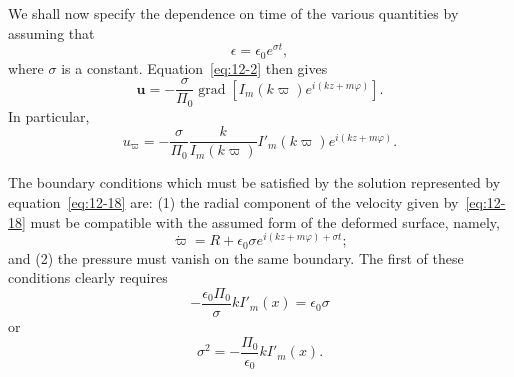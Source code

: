 We shall now specify the dependence on time of the various quantities by assuming that
\begin{equation}
\label{eq:12-16}
\epsilon = \epsilon_0 e^{\sigma t},
\end{equation}
where $\sigma$ is a constant. Equation~\eqref{eq:12-2} then gives
\begin{equation}
\label{eq:12-17}
\mathbf{u} = -\frac{\sigma}{\Pi_0}\operatorname{grad}[I_m(k\varpi)e^{i(kz+m\varphi)}].
\end{equation}
In particular,
\begin{equation}
\label{eq:12-18}
u_\varpi = -\frac{\sigma}{\Pi_0} \frac{k}{I_m(k\varpi)} I'_m(k\varpi) e^{i(kz+m\varphi)}.
\end{equation}

The boundary conditions which must be satisfied by the solution represented by equation~\eqref{eq:12-18} are: (1) the radial component of the velocity given by~\eqref{eq:12-18} must be compatible with the assumed form of the deformed surface, namely,
\begin{equation}
\label{eq:12-19}
\dot{\varpi} = R + \epsilon_0 \sigma e^{i(kz+m\varphi)+\sigma t};
\end{equation}
and (2) the pressure must vanish on the same boundary. The first of these conditions clearly requires
\begin{equation}
\label{eq:12-20}
-\frac{\epsilon_0 \Pi_0}{\sigma} k I'_m(x) = \epsilon_0 \sigma
\end{equation}
or
\begin{equation}
\label{eq:12-21}
\sigma^2 = -\frac{\Pi_0}{\epsilon_0} k I'_m(x).
\end{equation}

